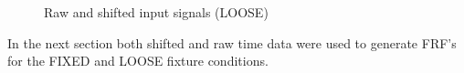 \documentclass[paper=a4, fontsize=12pt]{scrartcl} %
\begin{document}
	\begin{figure}[H]
		\centering
		\quad
		\caption{Raw and shifted input signals (LOOSE)}
		\label{fig:looseInputResponse2}
	\end{figure}
%
In the next section both shifted and raw time data were used to generate FRF's for the FIXED and LOOSE fixture conditions.
%
%
\end{document}
